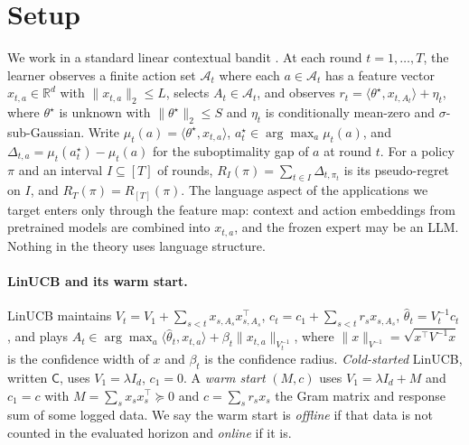 \documentclass{article}
\theoremstyle{definition}
\theoremstyle{remark}
\theoremstyle{remark}
\newcommand{\Cold}{\mathsf{C}}
\begin{document}
\section{Setup}
\label{sec:setup}
\label{sec:preliminaries}

We work in a standard linear contextual bandit
\cite{abbasi2011improved,chu2011contextual,lattimore2020bandit}. At each round
$t=1,\dots,T$, the learner observes a finite action set $\mathcal A_t$ where
each $a\in\mathcal A_t$ has a feature vector $x_{t,a}\in\mathbb R^d$ with
$\|x_{t,a}\|_2\le L$, selects $A_t\in\mathcal A_t$, and observes
$r_t=\langle\theta^\star,x_{t,A_t}\rangle+\eta_t$, where $\theta^\star$ is
unknown with $\|\theta^\star\|_2\le S$ and $\eta_t$ is conditionally mean-zero
and $\sigma$-sub-Gaussian. Write $\mu_t(a)=\langle\theta^\star,x_{t,a}\rangle$,
$a_t^\star\in\arg\max_a\mu_t(a)$, and $\Delta_{t,a}=\mu_t(a_t^\star)-\mu_t(a)$
for the suboptimality gap of $a$ at round $t$. For a policy $\pi$ and an
interval $I\subseteq[T]$ of rounds, $R_I(\pi)=\sum_{t\in I}\Delta_{t,\pi_t}$ is
its pseudo-regret on $I$, and $R_T(\pi)=R_{[T]}(\pi)$. The language aspect of
the applications we target enters only through the feature map: context and
action embeddings from pretrained models are combined into $x_{t,a}$, and the
frozen expert may be an LLM. Nothing in the theory uses language structure.

\paragraph{LinUCB and its warm start.}
LinUCB maintains $V_t=V_1+\sum_{s<t}x_{s,A_s}x_{s,A_s}^\top$,
$c_t=c_1+\sum_{s<t}r_sx_{s,A_s}$, $\widehat\theta_t=V_t^{-1}c_t$, and plays
$A_t\in\arg\max_a\langle\widehat\theta_t,x_{t,a}\rangle+\beta_t\|x_{t,a}\|_{V_t^{-1}}$,
where $\|x\|_{V^{-1}}=\sqrt{x^\top V^{-1}x}$ is the confidence width of $x$ and
$\beta_t$ is the confidence radius. \emph{Cold-started} LinUCB, written
$\Cold$, uses $V_1=\lambda I_d$, $c_1=0$. A \emph{warm start} $(M,c)$ uses
$V_1=\lambda I_d+M$ and $c_1=c$ with $M=\sum_sx_sx_s^\top\succeq0$ and
$c=\sum_sr_sx_s$ the Gram matrix and response sum of some logged data. We say
the warm start is \emph{offline} if that data is not counted in the evaluated
horizon and \emph{online} if it is.
\end{document}
